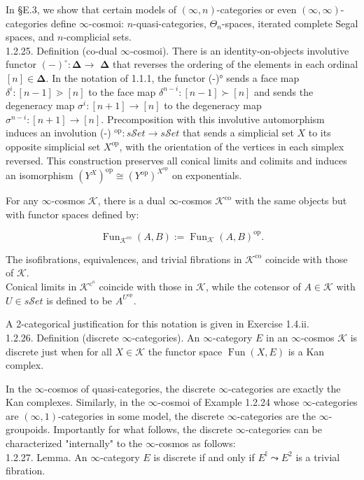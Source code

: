 \documentclass[10pt]{article}
\begin{document}
In §E.3, we show that certain models of $(\infty, n)$-categories or even $(\infty, \infty)$-categories define $\infty$-cosmoi: $n$-quasi-categories, $\Theta_{n}$-spaces, iterated complete Segal spaces, and $n$-complicial sets.\\
1.2.25. Definition (co-dual $\infty$-cosmoi). There is an identity-on-objects involutive functor $(-)^{\circ}: \boldsymbol{\Delta} \rightarrow$ $\boldsymbol{\Delta}$ that reverses the ordering of the elements in each ordinal $[n] \in \boldsymbol{\Delta}$. In the notation of 1.1.1, the functor (-)° sends a face map $\delta^{i}:[n-1] \gtrdot[n]$ to the face map $\delta^{n-i}:[n-1] \succ[n]$ and sends the degeneracy map $\sigma^{i}:[n+1] \rightarrow[n]$ to the degeneracy map $\sigma^{n-i}:[n+1] \rightarrow[n]$. Precomposition with this involutive automorphism induces an involution (-) ${ }^{\mathrm{op}}: s \mathcal{S} e t \rightarrow s \mathcal{S} e t$ that sends a simplicial set $X$ to its opposite simplicial set $X^{\mathrm{op}}$, with the orientation of the vertices in each simplex reversed. This construction preserves all conical limits and colimits and induces an isomorphism $\left(Y^{X}\right)^{\mathrm{op}} \cong\left(Y^{\mathrm{op}}\right)^{X^{\mathrm{op}}}$ on exponentials.

For any $\infty$-cosmos $\mathcal{K}$, there is a dual $\infty$-cosmos $\mathcal{K}^{\mathrm{co}}$ with the same objects but with functor spaces defined by:

$$
\operatorname{Fun}_{\mathcal{K}^{\mathrm{co}}}(A, B):=\operatorname{Fun}_{\mathcal{K}}(A, B)^{\mathrm{op}} .
$$

The isofibrations, equivalences, and trivial fibrations in $\mathcal{K}^{\mathrm{co}}$ coincide with those of $\mathcal{K}$.\\
Conical limits in $\mathcal{K}^{\mathrm{c}^{\mathrm{o}}}$ coincide with those in $\mathcal{K}$, while the cotensor of $A \in \mathcal{K}$ with $U \in s \mathcal{S} e t$ is defined to be $A^{U^{\mathrm{op}}}$.

A 2-categorical justification for this notation is given in Exercise 1.4.ii.\\
1.2.26. Definition (discrete $\infty$-categories). An $\infty$-category $E$ in an $\infty$-cosmos $\mathcal{K}$ is discrete just when for all $X \in \mathcal{K}$ the functor space $\operatorname{Fun}(X, E)$ is a Kan complex.

In the $\infty$-cosmos of quasi-categories, the discrete $\infty$-categories are exactly the Kan complexes. Similarly, in the $\infty$-cosmoi of Example 1.2.24 whose $\infty$-categories are $(\infty, 1)$-categories in some model, the discrete $\boldsymbol{\infty}$-categories are the $\boldsymbol{\infty}$-groupoids. Importantly for what follows, the discrete $\boldsymbol{\infty}$-categories can be characterized "internally" to the $\infty$-cosmos as follows:\\
1.2.27. Lemma. An $\infty$-category $E$ is discrete if and only if $E^{\mathbb{I}} \leadsto E^{2}$ is a trivial fibration.
\end{document}

